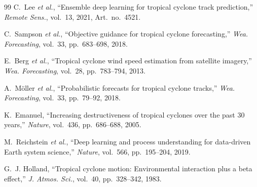 \documentclass[conference]{IEEEtran}
\begin{document}
\begin{thebibliography}{99}
C.~Lee \textit{et al.}, ``Ensemble deep learning for tropical cyclone track prediction,'' \textit{Remote Sens.}, vol.~13, 2021, Art.~no.~4521.

C.~Sampson \textit{et al.}, ``Objective guidance for tropical cyclone forecasting,'' \textit{Wea. Forecasting}, vol.~33, pp.~683--698, 2018.

E.~Berg \textit{et al.}, ``Tropical cyclone wind speed estimation from satellite imagery,'' \textit{Wea. Forecasting}, vol.~28, pp.~783--794, 2013.

A.~M\"oller \textit{et al.}, ``Probabilistic forecasts for tropical cyclone tracks,'' \textit{Wea. Forecasting}, vol.~33, pp.~79--92, 2018.

K.~Emanuel, ``Increasing destructiveness of tropical cyclones over the past 30 years,'' \textit{Nature}, vol.~436, pp.~686--688, 2005.

M.~Reichstein \textit{et al.}, ``Deep learning and process understanding for data-driven Earth system science,'' \textit{Nature}, vol.~566, pp.~195--204, 2019.

G.~J. Holland, ``Tropical cyclone motion: Environmental interaction plus a beta effect,'' \textit{J. Atmos. Sci.}, vol.~40, pp.~328--342, 1983.

\end{thebibliography}
\end{document}
